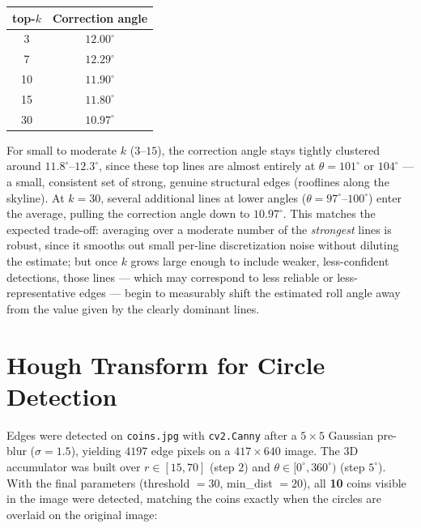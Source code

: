\documentclass[11pt]{article}
\begin{document}
\begin{center}
\begin{tabular}{cc}
\toprule
top-$k$ & Correction angle \\
\midrule
3  & $12.00^\circ$ \\
7  & $12.29^\circ$ \\
10 & $11.90^\circ$ \\
15 & $11.80^\circ$ \\
30 & $10.97^\circ$ \\
\bottomrule
\end{tabular}
\end{center}

For small to moderate $k$ ($3$--$15$), the correction angle stays tightly clustered around
$11.8^\circ$--$12.3^\circ$, since these top lines are almost entirely at $\theta=101^\circ$
or $104^\circ$ --- a small, consistent set of strong, genuine structural edges (rooflines
along the skyline). At $k=30$, several additional lines at lower angles
($\theta=97^\circ$--$100^\circ$) enter the average, pulling the correction angle down to
$10.97^\circ$. This matches the expected trade-off: averaging over a moderate number of the
\emph{strongest} lines is robust, since it smooths out small per-line discretization noise
without diluting the estimate; but once $k$ grows large enough to include weaker,
less-confident detections, those lines --- which may correspond to less reliable or
less-representative edges --- begin to measurably shift the estimated roll angle away from
the value given by the clearly dominant lines.

\section{Hough Transform for Circle Detection}

Edges were detected on \texttt{coins.jpg} with \texttt{cv2.Canny} after a $5\times5$
Gaussian pre-blur ($\sigma=1.5$), yielding $4197$ edge pixels on a $417\times640$ image.
The 3D accumulator was built over $r\in[15,70]$ (step $2$) and $\theta\in[0^\circ,360^\circ)$
(step $5^\circ$). With the final parameters (threshold $=30$, min\_dist $=20$), all
\textbf{10} coins visible in the image were detected, matching the coins exactly when the
circles are overlaid on the original image:
\end{document}
